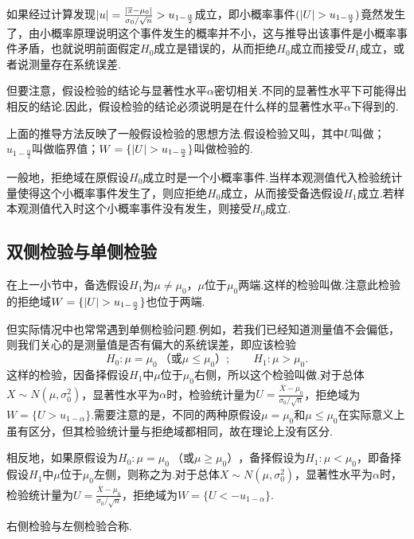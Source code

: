 如果经过计算发现\(\abs{u}=\frac{\abs{\overline{x}-\mu_0}}{\sigma_0 / \sqrt{n}}>u_{1-\frac{\alpha}{2}}\)成立，即小概率事件\((\abs{U}>u_{1-\frac{\alpha}{2}})\)竟然发生了，由小概率原理说明这个事件发生的概率并不小，这与推导出该事件是小概率事件矛盾，也就说明前面假定\(H_0\)成立是错误的，从而拒绝\(H_0\)成立而接受\(H_1\)成立，或者说测量存在系统误差.

但要注意，假设检验的结论与显著性水平\(\alpha\)密切相关.不同的显著性水平下可能得出相反的结论.因此，假设检验的结论必须说明是在什么样的显著性水平\(\alpha\)下得到的.

上面的推导方法反映了一般假设检验的思想方法.假设检验又叫，其中\(U\)叫做；\(u_{1-\frac{\alpha}{2}}\)叫做临界值；\(W=\{\abs{U}>u_{1-\frac{\alpha}{2}}\}\)叫做检验的.

一般地，拒绝域在原假设\(H_0\)成立时是一个小概率事件.当样本观测值代入检验统计量使得这个小概率事件发生了，则应拒绝\(H_0\)成立，从而接受备选假设\(H_1\)成立.若样本观测值代入时这个小概率事件没有发生，则接受\(H_0\)成立.

\subsection{双侧检验与单侧检验}
在上一小节中，备选假设\(H_1\)为\(\mu\neq\mu_0\)，\(\mu\)位于\(\mu_0\)两端.这样的检验叫做.注意此检验的拒绝域\(W=\{\abs{U}>u_{1-\frac{\alpha}{2}}\}\)也位于两端.

但实际情况中也常常遇到单侧检验问题.例如，若我们已经知道测量值不会偏低，则我们关心的是测量值是否有偏大的系统误差，即应该检验\[
H_0: \mu=\mu_0\ \text{（或}\mu\leqslant\mu_0\text{）}; \qquad H_1: \mu>\mu_0.
\]这样的检验，因备择假设\(H_1\)中\(\mu\)位于\(\mu_0\)右侧，所以这个检验叫做.对于总体\(X \sim N(\mu,\sigma_0^2)\)，显著性水平为\(\alpha\)时，检验统计量为\(U = \frac{\overline{X}-\mu_0}{\sigma_0 / \sqrt{n}}\)，拒绝域为\(W=\{U>u_{1-\alpha}\}\).需要注意的是，不同的两种原假设\(\mu=\mu_0\)和\(\mu\leqslant\mu_0\)在实际意义上虽有区分，但其检验统计量与拒绝域都相同，故在理论上没有区分.

相反地，如果原假设为\(H_0: \mu=\mu_0\ \text{（或}\mu\geqslant\mu_0\text{）}\)，备择假设为\(H_1: \mu<\mu_0\)，即备择假设\(H_1\)中\(\mu\)位于\(\mu_0\)左侧，则称之为.对于总体\(X \sim N(\mu,\sigma_0^2)\)，显著性水平为\(\alpha\)时，检验统计量为\(U = \frac{\overline{X}-\mu_0}{\sigma_0 / \sqrt{n}}\)，拒绝域为\(W=\{U<-u_{1-\alpha}\}\).

右侧检验与左侧检验合称.

